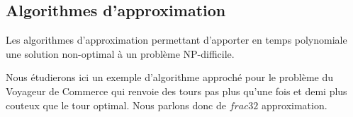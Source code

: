 \subsection{Algorithmes d'approximation}
Les algorithmes d'approximation permettant d'apporter en temps polynomiale une
solution non-optimal à un problème NP-difficile. 

Nous étudierons ici un exemple d'algorithme approché pour le problème du 
Voyageur de Commerce qui renvoie des tours pas plus qu'une fois et demi plus
couteux que le tour optimal. Nous parlons donc de $frac{3}{2}$ approximation.
